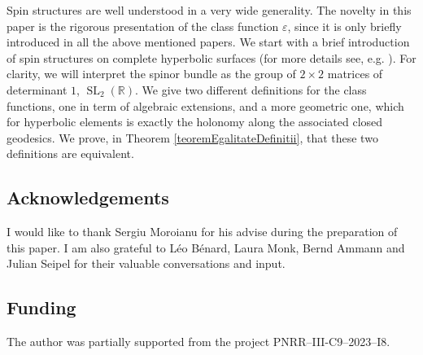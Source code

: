 \documentclass[12pt]{amsart}
\theoremstyle{definition}
\def\RR{{\mathbb R}}
\newcommand{\slinear}{\operatorname{SL}}
\begin{document}
Spin structures are well understood in a very wide generality. The novelty in this paper is the rigorous presentation of the class function $\varepsilon$, since it is only briefly introduced in all the above mentioned papers. We start with a brief introduction of spin structures on complete hyperbolic surfaces (for more details see, e.g. \cite{carteMoroianuSpinori, hitchin, lawsonMichelsohn}). For clarity, we will interpret the spinor bundle as the group of $2\times2$ matrices of determinant $1$, $\slinear_2(\RR)$. We give two different definitions for the class functions, one in term of algebraic extensions, and a more geometric one, which for hyperbolic elements is exactly the holonomy along the associated closed geodesics. We prove, in Theorem \ref{teoremEgalitateDefinitii}, that these two definitions are equivalent.

\subsection*{Acknowledgements} 
I would like to thank Sergiu Moroianu for his advise during the preparation of this paper. I am also grateful to Léo Bénard, Laura Monk, Bernd Ammann and Julian Seipel for their valuable conversations and input.

\subsection*{Funding}
The author was partially supported from the project PNRR–III-C9–2023–I8.
\end{document}
